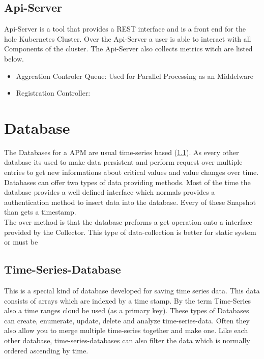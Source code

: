 \subsection{Api-Server}
\label{apiserver} 
Api-Server is a tool that provides a REST interface and is a front end for the hole Kubernetes Cluster. Over the Api-Server a user is able to interact with all Components of the cluster. The Api-Server also collects metrics witch are listed below.\\
\begin{itemize}
	\item Aggreation Controler Queue: Used for Parallel Processing as an Middelware
	\item Registration Controller:  
\end{itemize} 

\section{Database}
The Databases for a APM are usual time-series based (\ref{TS-Database}). As every other database its used to make data persistent and perform request over multiple entries to get new informations about critical values and value changes over time.
Databases can offer two types of data providing methods. Most of the time the database provides a well defined interface which normals provides a authentication method to insert data into the database. Every of these Snapshot than gets a timestamp.\\
The over method is that the database preforms a get operation onto a interface provided by the Collector. This type of data-collection is better for static system or must be 

\subsection{Time-Series-Database}
\label{TS-Database}
This is a special kind of database developed for saving time series data. This data consists of arrays which are indexed by a time stamp. By the term Time-Series also a time ranges cloud be used (as a primary key). These types of Databases  can create, enumerate, update, delete and analyze time-series-data.
Often they also allow you to merge multiple time-series together and make one.
Like each other database, time-series-databases can also filter the data which is normally ordered ascending by time.

